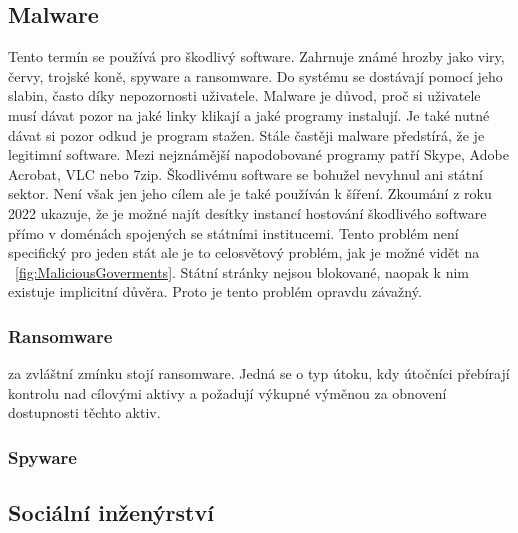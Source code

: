 \subsection{Malware}
Tento termín se používá pro škodlivý software.
Zahrnuje známé hrozby jako viry, červy, trojské koně, spyware a ransomware.
Do systému se dostávají pomocí jeho slabin, často díky nepozornosti uživatele.\cite{cisco_most_common_attack}
Malware je důvod, proč si uživatele musí dávat pozor na jaké linky klikají a jaké programy instalují.
Je také nutné dávat si pozor odkud je program stažen.
Stále častěji malware předstírá, že je legitimní software.
Mezi nejznámější napodobované programy patří Skype, Adobe Acrobat, VLC nebo 7zip.\cite{virustotal_report_findings}
Škodlivému software se bohužel nevyhnul ani státní sektor.
Není však jen jeho cílem ale je také používán k šíření.
Zkoumání z roku 2022 ukazuje, že je možné najít desítky instancí hostování škodlivého software přímo v doménách spojených se státními institucemi.\cite{virustotal_report_findings_goverment}
Tento problém není specifický pro jeden stát ale je to celosvětový problém, jak je možné vidět na ~\ref{fig:MaliciousGoverments}.
Státní stránky nejsou blokované, naopak k nim existuje implicitní důvěra.
Proto je tento problém opravdu závažný.
~\label{fig:MaliciousGoverments}

\subsubsection{Ransomware}
za zvláštní zmínku stojí ransomware.
Jedná se o typ útoku, kdy útočníci přebírají kontrolu nad cílovými aktivy a požadují výkupné výměnou za obnovení dostupnosti těchto aktiv.

\subsubsection{Spyware}


\subsection{Sociální inženýrství}


